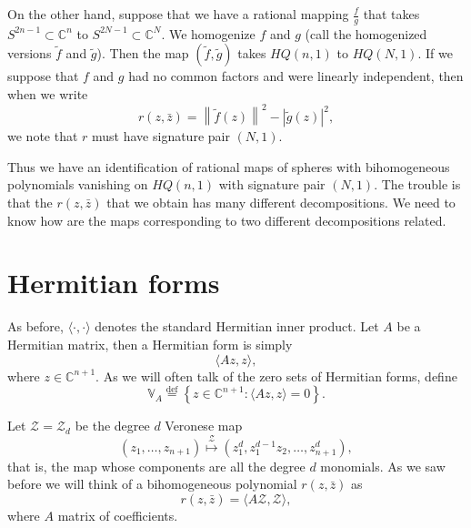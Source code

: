 \documentclass[12pt,openany]{book}
\newcommand{\abs}[1]{\left\lvert {#1} \right\rvert}
\newcommand{\norm}[1]{\left\lVert {#1} \right\rVert}
\newcommand{\C}{{\mathbb{C}}}
\newcommand{\bV}{{\mathbb{V}}}
\newcommand{\sZ}{{\mathcal{Z}}}
\theoremstyle{plain}
\theoremstyle{remark}
\theoremstyle{definition}
\theoremstyle{exercise}
\theoremstyle{example}
\begin{document}
On the other hand, suppose that we have a rational mapping $\frac{f}{g}$
that takes
$S^{2n-1} \subset \C^n$ to $S^{2N-1} \subset \C^N$.  We homogenize $f$ and
$g$ (call the homogenized versions $\tilde{f}$ and $\tilde{g}$).  Then
the map $(\tilde{f},\tilde{g})$ takes $HQ(n,1)$ to $HQ(N,1)$.
If we suppose that $f$ and $g$ had no common factors and were linearly
independent, then when we write
\begin{equation}
r(z,\bar{z}) = \norm{\tilde{f}(z)}^2 - \abs{\tilde{g}(z)}^2,
\end{equation}
we note that $r$ must have signature pair $(N,1)$.

Thus we have an identification of rational maps of spheres with bihomogeneous
polynomials vanishing on $HQ(n,1)$ with signature pair $(N,1)$.  The trouble
is that the $r(z,\bar{z})$ that we obtain has many different decompositions.
We need to know how are the maps corresponding to two different
decompositions related.


\section{Hermitian forms} \label{section:hermforms}

As before, $\langle \cdot , \cdot \rangle$ denotes the standard
Hermitian inner product.
Let $A$ be a Hermitian matrix, then a Hermitian form is simply
\begin{equation}
\langle A z , z \rangle ,
\end{equation}
where $z \in \C^{n+1}$.
As we will often talk of the zero sets of Hermitian forms,
define
\begin{equation}
\bV_A \overset{\text{def}}{=}
\left\{ z \in \C^{n+1} :
\langle A z , z \rangle = 0 \right\} .
\end{equation}

Let $\sZ = \sZ_d$ be the degree $d$ Veronese map
\begin{equation}
(z_1,\ldots,z_{n+1}) \overset{\sZ}{\mapsto}
(z_1^d,z_1^{d-1}z_2,\ldots,z_{n+1}^d),
\end{equation}
that is, the map
whose components are all the degree $d$ monomials.
As we saw before we will think of a bihomogeneous polynomial
$r(z,\bar{z})$ as
\begin{equation}
r(z,\bar{z}) = \langle A \sZ, \sZ \rangle ,
\end{equation}
where $A$
matrix of coefficients.
\end{document}

